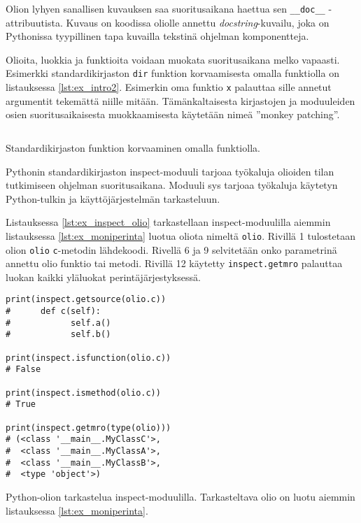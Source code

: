 \documentclass[finnish]{tktltiki2}
\theoremstyle{definition}
\theoremstyle{remark}
\begin{document}
Olion lyhyen sanallisen kuvauksen saa suoritusaikana haettua sen \verb|__doc__| -attribuutista. Kuvaus on koodissa oliolle annettu \emph{docstring}-kuvailu, joka on Pythonissa tyypillinen tapa kuvailla tekstinä ohjelman komponentteja.

Olioita, luokkia ja funktioita voidaan muokata suoritusaikana melko vapaasti. Esimerkki standardikirjaston \verb|dir| funktion korvaamisesta omalla funktiolla on listauksessa \ref{lst:ex_intro2}. Esimerkin oma funktio \verb|x| palauttaa sille annetut argumentit tekemättä niille mitään. Tämänkaltaisesta kirjastojen ja moduuleiden osien suoritusaikaisesta muokkaamisesta käytetään nimeä ''monkey patching''.

\begin{listing}[htb]
    \inputminted[linenos,frame=single,framesep=10pt]{python}{code/introspektio2.py}
    \caption{Standardikirjaston funktion korvaaminen omalla funktiolla.}
    \label{lst:ex_intro2}
\end{listing}

Pythonin standardikirjaston inspect-moduuli tarjoaa työkaluja olioiden tilan tutkimiseen ohjelman suoritusaikana. Moduuli sys tarjoaa työkaluja käytetyn Python-tulkin ja käyttöjärjestelmän tarkasteluun.

Listauksessa \ref{lst:ex_inspect_olio} tarkastellaan inspect-moduulilla aiemmin listauksessa \ref{lst:ex_moniperinta} luotua oliota nimeltä \verb|olio|. Rivillä 1 tulostetaan olion \verb|olio| \verb|c|-metodin lähdekoodi. Rivellä 6 ja 9 selvitetään onko parametrinä annettu olio funktio tai metodi. Rivillä 12 käytetty \verb|inspect.getmro| palauttaa luokan kaikki yläluokat perintäjärjestyksessä.

\begin{listing}[htb]
\begin{verbatim}
print(inspect.getsource(olio.c))
#      def c(self):
#            self.a()
#            self.b()

print(inspect.isfunction(olio.c))
# False

print(inspect.ismethod(olio.c))
# True

print(inspect.getmro(type(olio)))
# (<class '__main__.MyClassC'>,
#  <class '__main__.MyClassA'>,
#  <class '__main__.MyClassB'>,
#  <type 'object'>)

\end{verbatim}
    \caption{Python-olion tarkastelua inspect-moduulilla. Tarkasteltava olio on luotu aiemmin listauksessa \ref{lst:ex_moniperinta}.}
    \label{lst:ex_inspect_olio}
\end{listing}
\end{document}
